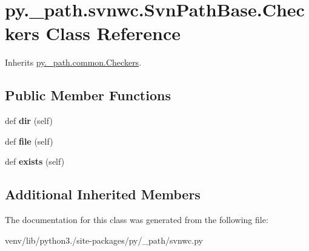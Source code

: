 \hypertarget{classpy_1_1__path_1_1svnwc_1_1_svn_path_base_1_1_checkers}{}\section{py.\+\_\+path.\+svnwc.\+Svn\+Path\+Base.\+Checkers Class Reference}
\label{classpy_1_1__path_1_1svnwc_1_1_svn_path_base_1_1_checkers}


Inherits \hyperlink{classpy_1_1__path_1_1common_1_1_checkers}{py.\+\_\+path.\+common.\+Checkers}.

\subsection*{Public Member Functions}
\begin{DoxyCompactItemize}
\item 
\mbox{\label{classpy_1_1__path_1_1svnwc_1_1_svn_path_base_1_1_checkers_a48143b20a0139be8c085e20eed311a8a}} 
def {\bfseries dir} (self)
\item 
\mbox{\label{classpy_1_1__path_1_1svnwc_1_1_svn_path_base_1_1_checkers_aac6720ff93f6a253dfa06ad558c1301a}} 
def {\bfseries file} (self)
\item 
\mbox{\label{classpy_1_1__path_1_1svnwc_1_1_svn_path_base_1_1_checkers_aa77895252947a204546396a61e4db323}} 
def {\bfseries exists} (self)
\end{DoxyCompactItemize}
\subsection*{Additional Inherited Members}


The documentation for this class was generated from the following file\+:\begin{DoxyCompactItemize}
\item 
venv/lib/python3./site-\/packages/py/\+\_\+path/svnwc.\+py\end{DoxyCompactItemize}
